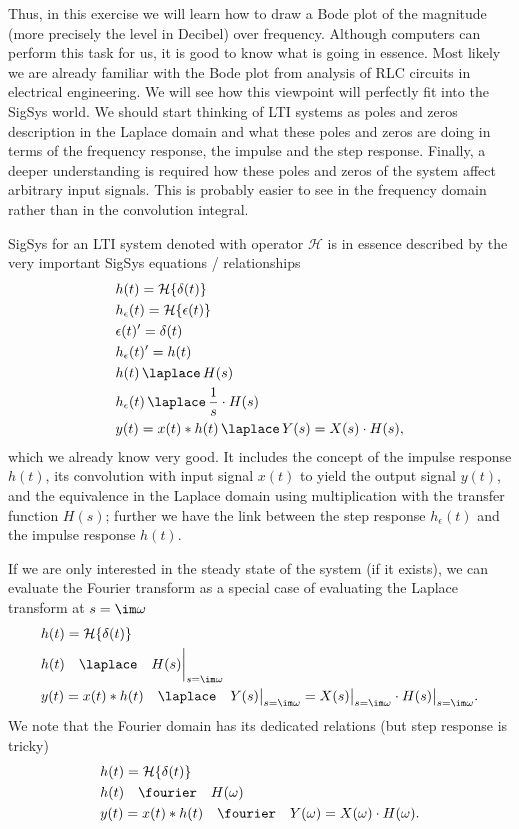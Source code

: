 Thus, in this exercise we will learn how to draw a Bode plot of the
magnitude (more precisely the level in Decibel) over frequency.
Although computers can perform this task for us, it is good to
know what is going in essence.
Most likely we are already familiar with the Bode plot from analysis of RLC
circuits in electrical engineering. We will see how this viewpoint will
perfectly fit into the SigSys world. We should start thinking of LTI systems as
poles and zeros description in the Laplace domain and what these poles and zeros
are doing in terms of the frequency response, the impulse and the step response.
Finally, a deeper understanding is required how these poles and zeros of the system affect arbitrary input signals. This is probably easier to see in the frequency domain rather than in the convolution integral.

\begin{mdframed}
SigSys for an LTI system denoted with operator $\mathcal{H}$ is in essence described
by the very important SigSys equations / relationships
\begin{align}
&h(t) = \mathcal{H}\{\delta(t)\}\\
&h_\epsilon(t) = \mathcal{H}\{\epsilon(t)\}\\
& \epsilon(t)' = \delta(t)\\
&h_\epsilon(t)' = h(t)\\
&h(t) \,\laplace\, H(s)\\
&h_\epsilon(t) \,\laplace\, \frac{1}{s} \cdot H(s)\\
&y(t) = x(t) \ast h(t) \,\laplace\, Y(s) = X(s) \cdot H(s),
\end{align}
which we already know very good.
%
It includes the concept of the impulse response $h(t)$, its convolution with input
signal $x(t)$ to yield the output signal $y(t)$, and the equivalence in the Laplace
domain using multiplication with the transfer function $H(s)$; further we have the link between the step response $h_\epsilon(t)$ and the impulse response $h(t)$.

If we are only interested in the steady state of the system
(if it exists), we can evaluate the Fourier transform as a special case of evaluating the Laplace transform at $s=\im\omega$
\begin{align}
&h(t) = \mathcal{H}\{\delta(t)\}\\
&h(t) \quad\laplace\quad H(s)\bigg|_{s=\im\omega}\\
&y(t) = x(t) \ast h(t) \quad\laplace\quad Y(s)\big|_{s=\im\omega} = X(s)\big|_{s=\im\omega} \cdot H(s)\big|_{s=\im\omega}.
\end{align}
%
We note that the Fourier domain has its dedicated relations (but step response is tricky)
\begin{align}
&h(t) = \mathcal{H}\{\delta(t)\}\\
&h(t) \quad\fourier\quad H(\omega)\\
&y(t) = x(t) \ast h(t) \quad\fourier\quad Y(\omega) = X(\omega) \cdot H(\omega).
\end{align}
\end{mdframed}

